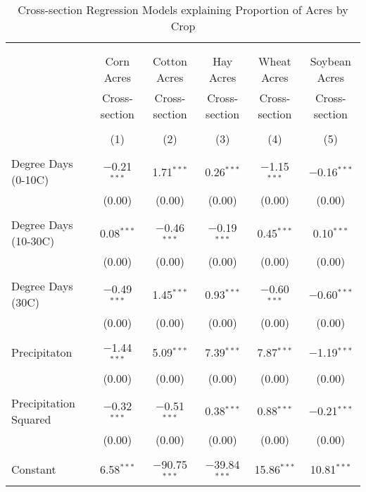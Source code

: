 \documentclass[10pt]{article}
\begin{document}
\begin{table}[!htbp] \centering 
  \caption{Cross-section Regression Models explaining Proportion of Acres by Crop} 
  \label{} 
\footnotesize 
\begin{tabular}{@{\extracolsep{5pt}}lccccc} 
\\[-1.8ex]\hline 
\hline \\[-1.8ex] 
\\[-1.8ex] & Corn Acres & Cotton Acres & Hay Acres & Wheat Acres & Soybean Acres \\ 
 & Cross-section & Cross-section & Cross-section & Cross-section & Cross-section \\ 
\\[-1.8ex] & (1) & (2) & (3) & (4) & (5)\\ 
\hline \\[-1.8ex] 
 Degree Days (0-10C) & $-$0.21$^{***}$ & 1.71$^{***}$ & 0.26$^{***}$ & $-$1.15$^{***}$ & $-$0.16$^{***}$ \\ 
  & (0.00) & (0.00) & (0.00) & (0.00) & (0.00) \\ 
  & & & & & \\ 
 Degree Days (10-30C) & 0.08$^{***}$ & $-$0.46$^{***}$ & $-$0.19$^{***}$ & 0.45$^{***}$ & 0.10$^{***}$ \\ 
  & (0.00) & (0.00) & (0.00) & (0.00) & (0.00) \\ 
  & & & & & \\ 
 Degree Days (30C) & $-$0.49$^{***}$ & 1.45$^{***}$ & 0.93$^{***}$ & $-$0.60$^{***}$ & $-$0.60$^{***}$ \\ 
  & (0.00) & (0.00) & (0.00) & (0.00) & (0.00) \\ 
  & & & & & \\ 
 Precipitaton & $-$1.44$^{***}$ & 5.09$^{***}$ & 7.39$^{***}$ & 7.87$^{***}$ & $-$1.19$^{***}$ \\ 
  & (0.00) & (0.00) & (0.00) & (0.00) & (0.00) \\ 
  & & & & & \\ 
 Precipitation Squared & $-$0.32$^{***}$ & $-$0.51$^{***}$ & 0.38$^{***}$ & 0.88$^{***}$ & $-$0.21$^{***}$ \\ 
  & (0.00) & (0.00) & (0.00) & (0.00) & (0.00) \\ 
  & & & & & \\ 
 Constant & 6.58$^{***}$ & $-$90.75$^{***}$ & $-$39.84$^{***}$ & 15.86$^{***}$ & 10.81$^{***}$ \\ 

\end{tabular}
\end{table}
\end{document}
